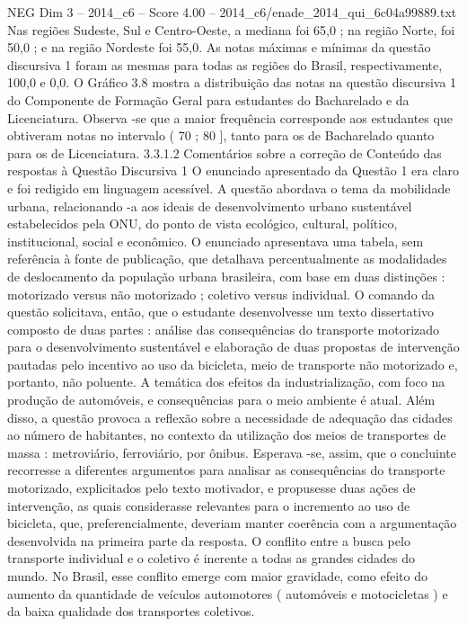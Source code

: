 \begin{textsample}{NEG Dim 3 – 2014\_c6 – Score 4.00 – 2014\_c6/enade\_2014\_qui\_6c04a99889.txt}
Nas regiões Sudeste, Sul e Centro-Oeste, a mediana foi 65,0 ; na região Norte, foi 50,0 ; e na região Nordeste foi 55,0.
As notas máximas e mínimas da questão discursiva 1 foram as mesmas para todas as regiões do Brasil, respectivamente, 100,0 e 0,0.
O Gráfico 3.8 mostra a distribuição das notas na questão discursiva 1 do Componente de Formação Geral para estudantes do Bacharelado e da Licenciatura.
Observa -se que a maior frequência corresponde aos estudantes que obtiveram notas no intervalo ( 70 ; 80 ], tanto para os de Bacharelado quanto para os de Licenciatura. 3.3.1.2 Comentários sobre a correção de Conteúdo das respostas à Questão Discursiva 1 O enunciado apresentado da Questão 1 era claro e foi redigido em linguagem acessível.
A questão abordava o tema da mobilidade urbana, relacionando -a aos ideais de desenvolvimento urbano sustentável estabelecidos pela ONU, do ponto de vista ecológico, cultural, político, institucional, social e econômico.
O enunciado apresentava uma tabela, sem referência à fonte de publicação, que detalhava percentualmente as modalidades de deslocamento da população urbana brasileira, com base em duas distinções : motorizado versus não motorizado ; coletivo versus individual.
O comando da questão solicitava, então, que o estudante desenvolvesse um texto dissertativo composto de duas partes : análise das consequências do transporte motorizado para o desenvolvimento sustentável e elaboração de duas propostas de intervenção pautadas pelo incentivo ao uso da bicicleta, meio de transporte não motorizado e, portanto, não poluente.
A temática dos efeitos da industrialização, com foco na produção de automóveis, e consequências para o meio ambiente é atual.
Além disso, a questão provoca a reflexão sobre a necessidade de adequação das cidades ao número de habitantes, no contexto da utilização dos meios de transportes de massa : metroviário, ferroviário, por ônibus.
Esperava -se, assim, que o concluinte recorresse a diferentes argumentos para analisar as consequências do transporte motorizado, explicitados pelo texto motivador, e propusesse duas ações de intervenção, as quais considerasse relevantes para o incremento ao uso de bicicleta, que, preferencialmente, deveriam manter coerência com a argumentação desenvolvida na primeira parte da resposta.
O conflito entre a busca pelo transporte individual e o coletivo é inerente a todas as grandes cidades do mundo.
No Brasil, esse conflito emerge com maior gravidade, como efeito do aumento da quantidade de veículos automotores ( automóveis e motocicletas ) e da baixa qualidade dos transportes coletivos.

\end{textsample}
